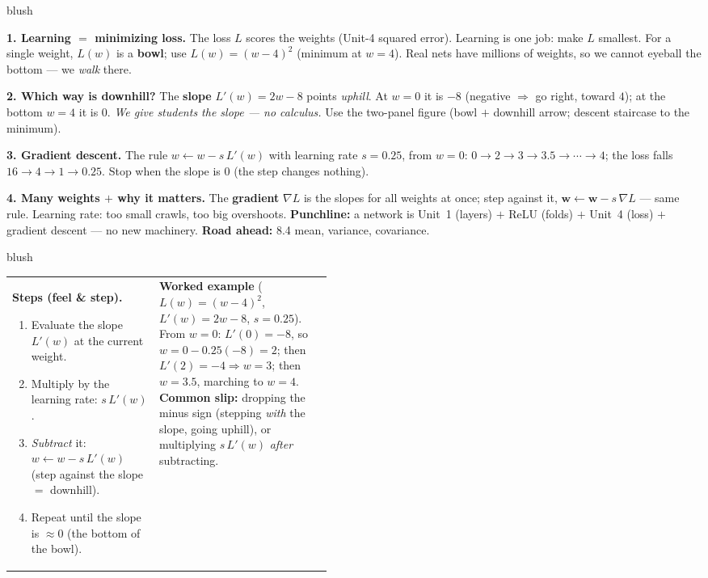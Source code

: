 \documentclass[10pt]{article}
\newcommand{\ww}{\mathbf{w}}
\begin{document}
\begin{skillbox}[Lesson]{blush}
\begin{multicols}{2}
\textbf{1. Learning $=$ minimizing loss.} The loss $L$ scores the weights (Unit-4 squared error). Learning is
one job: make $L$ smallest. For a single weight, $L(w)$ is a \textbf{bowl}; use $L(w)=(w-4)^2$ (minimum at
$w=4$). Real nets have millions of weights, so we cannot eyeball the bottom --- we \emph{walk} there.

\textbf{2. Which way is downhill?} The \textbf{slope} $L'(w)=2w-8$ points \emph{uphill}. At $w=0$ it is $-8$
(negative $\Rightarrow$ go right, toward $4$); at the bottom $w=4$ it is $0$. \emph{We give students the slope
--- no calculus.} Use the two-panel figure (bowl $+$ downhill arrow; descent staircase to the minimum).

\columnbreak

\textbf{3. Gradient descent.} The rule $w\leftarrow w-s\,L'(w)$ with learning rate $s=0.25$, from $w=0$:
$0\to2\to3\to3.5\to\cdots\to4$; the loss falls $16\to4\to1\to0.25$. Stop when the slope is $0$ (the step
changes nothing).

\textbf{4. Many weights $+$ why it matters.} The \textbf{gradient} $\nabla L$ is the slopes for all weights at
once; step against it, $\ww\leftarrow\ww-s\,\nabla L$ --- same rule. Learning rate: too small crawls, too big
overshoots. \textbf{Punchline:} a network is Unit~1 (layers) $+$ ReLU (folds) $+$ Unit~4 (loss) $+$ gradient
descent --- no new machinery. \textbf{Road ahead:} 8.4 mean, variance, covariance.
\end{multicols}
\end{skillbox}

\begin{skillbox}{blush}
\begin{tabularx}{\linewidth}{@{}p{0.46\linewidth} X@{}}
\textbf{Steps (feel \& step).}
\begin{enumerate}[leftmargin=1.3em, nosep, after=\vspace{2pt}]
  \item Evaluate the slope $L'(w)$ at the current weight.
  \item Multiply by the learning rate: $s\,L'(w)$.
  \item \emph{Subtract} it: $w\leftarrow w-s\,L'(w)$ (step against the slope $=$ downhill).
  \item Repeat until the slope is $\approx 0$ (the bottom of the bowl).
\end{enumerate}
&
\textbf{Worked example} ($L(w)=(w-4)^2$, $L'(w)=2w-8$, $s=0.25$). From $w=0$: $L'(0)=-8$, so
$w=0-0.25(-8)=2$; then $L'(2)=-4\Rightarrow w=3$; then $w=3.5$, marching to $w=4$. \textbf{Common slip:}
dropping the minus sign (stepping \emph{with} the slope, going uphill), or multiplying $s\,L'(w)$
\emph{after} subtracting.
\end{tabularx}
\end{skillbox}
\end{document}
